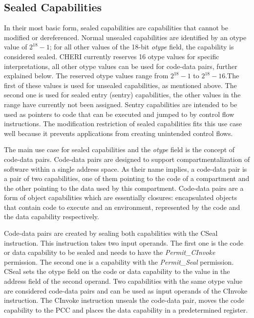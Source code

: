 \subsection{Sealed Capabilities}
\label{sec:sealed}
In their most basic form, sealed capabilities are capabilities that cannot be modified or dereferenced. Normal unsealed capabilities are identified by an otype value of $2^{18} - 1$; for all other values of the 18-bit \textit{otype} field, the capability is considered sealed. CHERI currently reserves 16 otype values for specific interpretations, all other otype values can be used for code-data pairs, further explained below. The reserved otype values range from $2^{18} - 1$ to $2^{18} - 16$.The first of these values is used for unsealed capabilities, as mentioned above. The second one is used for sealed entry (sentry) capabilities, the other values in the range have currently not been assigned. Sentry capabilities are intended to be used as pointers to code that can be executed and jumped to by control flow instructions. The modification restriction of sealed capabilities fits this use case well because it prevents applications from creating unintended control flows.

The main use case for sealed capabilities and the \textit{otype} field is the concept of code-data pairs. Code-data pairs are designed to support compartmentalization of software within a single address space. As their name implies, a code-data pair is a pair of two capabilities, one of them pointing to the code of a compartment and the other pointing to the data used by this compartment. Code-data pairs are a form of object capabilities which are essentially closures: encapsulated objects that contain code to execute and an environment, represented by the code and the data capability respectively.

Code-data pairs are created by sealing both capabilities with the CSeal instruction. This instruction takes two input operands. The first one is the code or data capability to be sealed and needs to have the \textit{Permit\_CInvoke} permission. The second one is a capability with the \textit{Permit\_Seal} permission. CSeal sets the otype field on the code or data capability to the value in the address field of the second operand. Two capabilities with the same otype value are considered code-data pairs and can be used as input operands of the CInvoke instruction. The CInvoke instruction unseals the code-data pair, moves the code capability to the PCC and places the data capability in a predetermined register.

